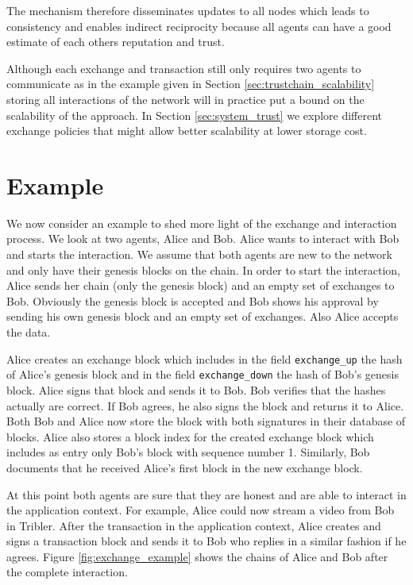 The mechanism therefore disseminates updates to all nodes which leads to consistency and enables 
indirect reciprocity because all agents can have a good estimate of each others reputation and trust.

Although each exchange and 
transaction still only requires two agents to communicate as in the example given in 
Section \ref{sec:trustchain_scalability} storing all interactions of the network will in practice 
put a bound on the scalability of the approach. In Section \ref{sec:system_trust} we explore 
different exchange policies that might allow better scalability at lower storage cost.

\section{Example}
We now consider an example to shed more light of the exchange and interaction process. We look at two
agents, Alice and Bob. Alice wants to interact with Bob and starts the interaction. We assume that
both agents are new to the network and only have their genesis blocks on the chain. In order to
start the interaction, Alice sends her chain (only the genesis block) and an empty set of exchanges
to Bob. Obviously the genesis block is accepted and Bob shows his approval by sending his own
genesis block and an empty set of exchanges. Also Alice accepts the data. 

Alice creates an exchange
block which includes in the field \verb|exchange_up| the hash of Alice's genesis block and in the field 
\verb|exchange_down| the hash of Bob's genesis block. Alice signs that block and sends it to Bob. 
Bob verifies that the hashes actually are correct. If Bob agrees, he also signs the block and returns 
it to Alice. Both Bob and Alice now store the block with both signatures in their database of blocks.
Alice also stores a block index for the created exchange block which includes as entry 
only Bob's block with sequence number 1. Similarly, Bob documents that he received Alice's first block
in the new exchange block.

At this point both agents are sure that they are honest and are able to interact in the 
application context. For example, Alice could now stream a video from Bob in Tribler. After the transaction in 
the application context, Alice creates and signs a transaction block and sends it to Bob who replies 
in a similar fashion if he agrees. Figure \ref{fig:exchange_example} shows the chains of Alice and 
Bob after the complete interaction. 

